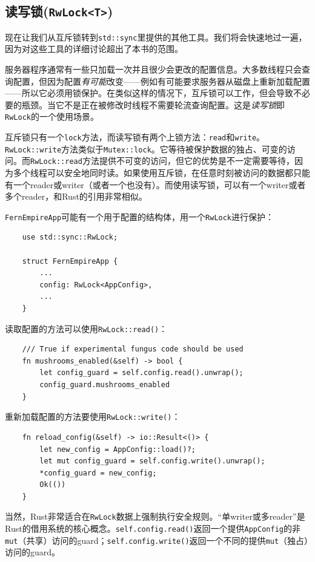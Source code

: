 \subsection{读写锁(\texttt{RwLock<T>})}
现在让我们从互斥锁转到\texttt{std::sync}里提供的其他工具。我们将会快速地过一遍，因为对这些工具的详细讨论超出了本书的范围。

服务器程序通常有一些只加载一次并且很少会更改的配置信息。大多数线程只会查询配置，但因为配置\emph{有可能}改变——例如有可能要求服务器从磁盘上重新加载配置——所以它必须用锁保护。在类似这样的情况下，互斥锁可以工作，但会导致不必要的瓶颈。当它不是正在被修改时线程不需要轮流查询配置。这是\emph{读写锁}即\texttt{RwLock}的一个使用场景。

互斥锁只有一个\texttt{lock}方法，而读写锁有两个上锁方法：\texttt{read}和\texttt{write}。\texttt{RwLock::write}方法类似于\texttt{Mutex::lock}。它等待被保护数据的独占、可变的访问。而\texttt{RwLock::read}方法提供不可变的访问，但它的优势是不一定需要等待，因为多个线程可以安全地同时读。如果使用互斥锁，在任意时刻被访问的数据都只能有一个reader或writer（或者一个也没有）。而使用读写锁，可以有一个writer或者多个reader，和Rust的引用非常相似。

\texttt{FernEmpireApp}可能有一个用于配置的结构体，用一个\texttt{RwLock}进行保护：
\begin{verbatim}
    use std::sync::RwLock;

    struct FernEmpireApp {
        ...
        config: RwLock<AppConfig>,
        ...
    }
\end{verbatim}

读取配置的方法可以使用\texttt{RwLock::read()}：
\begin{verbatim}
    /// True if experimental fungus code should be used 
    fn mushrooms_enabled(&self) -> bool {
        let config_guard = self.config.read().unwrap();
        config_guard.mushrooms_enabled
    }
\end{verbatim}

重新加载配置的方法要使用\texttt{RwLock::write()}：
\begin{verbatim}
    fn reload_config(&self) -> io::Result<()> {
        let new_config = AppConfig::load()?;
        let mut config_guard = self.config.write().unwrap();
        *config_guard = new_config;
        Ok(())
    }
\end{verbatim}

当然，Rust非常适合在\texttt{RwLock}数据上强制执行安全规则。“单writer或多reader”是Rust的借用系统的核心概念。\texttt{self.config.read()}返回一个提供\texttt{AppConfig}的非\texttt{mut}（共享）访问的guard；\texttt{self.config.write()}返回一个不同的提供\texttt{mut}（独占）访问的guard。

